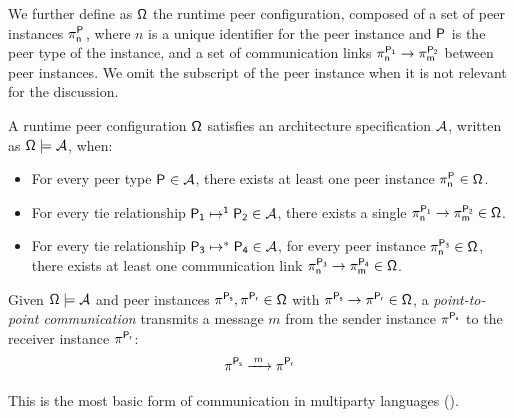 \documentclass[runningheads]{llncs}
\begin{document}
We further define as $\peerconf$ the runtime peer configuration,
composed of a set of peer instances $\epeer{n}{\pfam}$,
where $n$ is a unique identifier for the peer instance and $\pfam$ is the peer type of the instance,
and a set of communication links $\link{\epeer{n}{\pfam[1]}}{\epeer{m}{\pfam[2]}}$ between peer instances.
%
We omit the subscript of the peer instance when it is not relevant for the discussion.

\begin{definition}\label{def:arch-satisfaction}
  A runtime peer configuration $\peerconf$ satisfies an architecture specification $\arch$,
  written as $\peerconf \models \arch$, when:
\begin{itemize}
  \item For every peer type $\pfam \in \arch$, there exists at least one peer instance $\epeer{n}{\pfam} \in \peerconf$.
  \item For every tie relationship $\tieSingle{\pfam[1]}{\pfam[2]} \in \arch$, there exists a single $\link{\epeer{n}{\pfam[1]}}{\epeer{m}{\pfam[2]}} \in \peerconf$.
  \item For every tie relationship $\tieMult{\pfam[3]}{\pfam[4]} \in \arch$, for every peer instance $\epeer{n}{\pfam[3]} \in \peerconf$, there exists at least one communication link $\link{\epeer{n}{\pfam[3]}}{\epeer{m}{\pfam[4]}} \in \peerconf$.
\end{itemize}
\end{definition}


\sloppypar
\begin{definition}\label{def:point-to-point}
  Given $\peerconf \models \arch$ and peer instances $\epeer{}{P_s}, \epeer{}{P_r} \in \peerconf$ with $\link{\epeer{}{P_s}}{\epeer{}{P_r}} \in \peerconf$,
  a \emph{point-to-point communication} transmits a message $m$ from the sender instance $\epeer{}{P_s}$ to the receiver instance $\epeer{}{P_r}$:
\[
  \epeer{}{P_s} \xrightarrow{\;m\;} \epeer{}{P_r}
\]
\end{definition}
%
This is the most basic form of communication in multiparty languages ().
\end{document}
